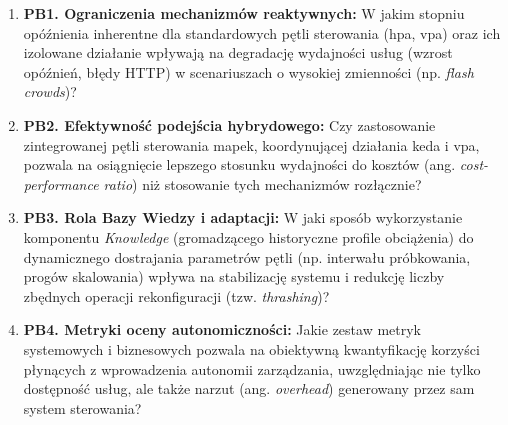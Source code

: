 \begin{enumerate}
    \item \textbf{PB1. Ograniczenia mechanizmów reaktywnych:} 
    W jakim stopniu opóźnienia inherentne dla standardowych pętli sterowania (\gls{hpa}, \gls{vpa}) oraz ich izolowane 
    działanie wpływają na degradację wydajności usług (wzrost opóźnień, błędy HTTP) w scenariuszach o wysokiej zmienności 
    (np. \textit{flash crowds})?
    
    \item \textbf{PB2. Efektywność podejścia hybrydowego:} 
    Czy zastosowanie zintegrowanej pętli sterowania \gls{mapek}, koordynującej działania \gls{keda} i \gls{vpa}, pozwala 
    na osiągnięcie lepszego stosunku wydajności do kosztów (ang. \textit{cost-performance ratio}) niż stosowanie tych 
    mechanizmów rozłącznie?
    
    \item \textbf{PB3. Rola Bazy Wiedzy i adaptacji:} 
    W jaki sposób wykorzystanie komponentu \textit{Knowledge} (gromadzącego historyczne profile obciążenia) do dynamicznego 
    dostrajania parametrów pętli (np. interwału próbkowania, progów skalowania) wpływa na stabilizację systemu i redukcję 
    liczby zbędnych operacji rekonfiguracji (tzw. \textit{thrashing})?
    
    \item \textbf{PB4. Metryki oceny autonomiczności:} 
    Jakie zestaw metryk systemowych i biznesowych pozwala na obiektywną kwantyfikację korzyści płynących z wprowadzenia 
    autonomii zarządzania, uwzględniając nie tylko dostępność usług, ale także narzut (ang. \textit{overhead}) generowany 
    przez sam system sterowania?
\end{enumerate}
